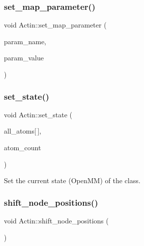 \subsubsection{\texorpdfstring{set\_map\_parameter()}{set\_map\_parameter()}}
{\footnotesize\ttfamily void Actin\+::set\+\_\+map\+\_\+parameter (\begin{DoxyParamCaption}\item[{std\+::string}]{param\+\_\+name,  }\item[{double}]{param\+\_\+value }\end{DoxyParamCaption})}

\mbox{\label{classActin_aad0ed7a72cc34036014fef4f3cf97937}} 
\subsubsection{\texorpdfstring{set\_state()}{set\_state()}}
{\footnotesize\ttfamily void Actin\+::set\+\_\+state (\begin{DoxyParamCaption}\item[{\mbox{\hyperlink{structMyAtomInfo}{My\+Atom\+Info}}}]{all\+\_\+atoms\mbox{[}$\,$\mbox{]},  }\item[{int}]{atom\+\_\+count }\end{DoxyParamCaption})}

Set the current state (Open\+MM) of the class. \mbox{\label{classActin_a87b0ca52480019247fa0075259619458}} 
\subsubsection{\texorpdfstring{shift\_node\_positions()}{shift\_node\_positions()}}
{\footnotesize\ttfamily void Actin\+::shift\+\_\+node\+\_\+positions (\begin{DoxyParamCaption}\item[{void}]{ }\end{DoxyParamCaption})\hspace{0.3cm}{\ttfamily [inline]}}

\mbox{\label{classActin_abc3996bfa64fb278823dc4e85c4ec9a4}} 

